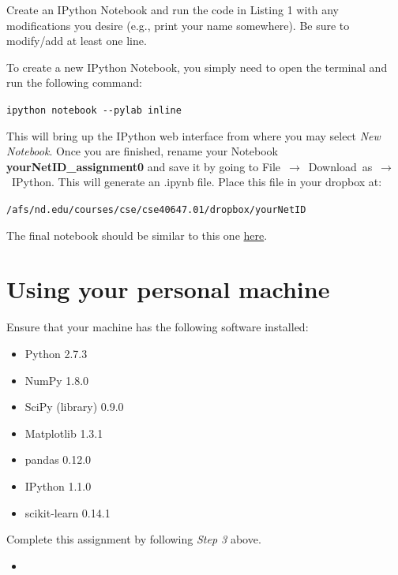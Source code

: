 \documentclass[paper=a4, fontsize=11pt]{scrartcl} %
\numberwithin{equation}{section} %
\numberwithin{figure}{section} %
\numberwithin{table}{section} %
\newcommand{\perlscript}[2]{
\begin{itemize}
\item[]
\end{itemize}
}
\begin{document}
Create an IPython Notebook and run the code in Listing 1 with any modifications you desire (e.g., print your name somewhere). Be sure to modify/add at least one line.

\vspace{8pt}

To create a new IPython Notebook, you simply need to open the terminal and run the following command:

\begin{center}
\texttt{ipython notebook \--\--pylab inline}
\end{center}

This will bring up the IPython web interface from where you may select \textit{New Notebook}. Once you are finished, rename your Notebook \textbf{yourNetID\_assignment0} and save it by going to \mbox{File $\rightarrow$ Download as $\rightarrow$ IPython}. This will generate an .ipynb file. Place this file in your dropbox at:

\begin{center}
\texttt{/afs/nd.edu/courses/cse/cse40647.01/dropbox/yourNetID}
\end{center}

The final notebook should be similar to this one \href{https://github.com/cse40647/cse40647/blob/sp.14/assignment0/assignment0_sol.ipynb}{here}.

\clearpage
\section{Using your personal machine}

Ensure that your machine has the following software installed:

\begin{itemize}
\item Python 2.7.3
\item NumPy 1.8.0
\item SciPy (library) 0.9.0
\item Matplotlib 1.3.1
\item pandas 0.12.0
\item IPython 1.1.0
\item scikit-learn 0.14.1
\end{itemize}

Complete this assignment by following \textit{Step 3} above.

\clearpage

\perlscript{code}{Sample Python code for testing required modules}
\end{document}
